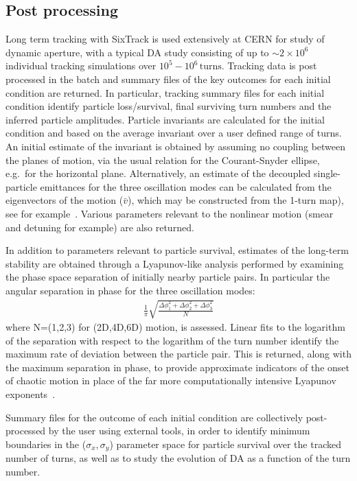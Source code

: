 \documentclass[a4paper,
              ]{jacow}
\begin{document}
\subsection{Post processing}
Long term tracking with SixTrack is used extensively at CERN for study of dynamic aperture, with a typical DA study consisting of up to $\sim 2\times 10^{6}$ individual tracking simulations over $10^5-10^6\,\mathrm{turns}$.
Tracking data is post processed in the batch and summary files of the key outcomes for each initial condition are returned.
In particular, tracking summary files for each initial condition identify particle loss/survival, final surviving turn numbers and the inferred particle amplitudes.
Particle invariants are calculated for the initial condition and based on the average invariant over a user defined range of turns.
An initial estimate of the invariant is obtained by assuming no coupling between the planes of motion, via the usual relation for the Courant-Snyder ellipse, e.g.\ for the horizontal plane.
Alternatively, an estimate of the decoupled single-particle emittances for the three oscillation modes can be calculated from the eigenvectors of the motion ($\bar{v}$), which may be constructed from the 1-turn map), see for example~\cite{maisripken}.
Various parameters relevant to the nonlinear motion (smear and detuning for example) are also returned.

In addition to parameters relevant to particle survival, estimates of the long-term stability are obtained through a Lyapunov-like analysis performed by examining the phase space separation of initially nearby particle pairs.
In particular the angular separation in phase for the three oscillation modes:
\begin{align}
&\frac{1}{\pi}\sqrt{\frac{ \Delta\phi_{1}^2 + \Delta\phi_{2}^2 + \Delta\phi_{3}^2 }{N}}&\nonumber
\end{align}
where N=(1,2,3) for (2D,4D,6D) motion, is assessed.
Linear fits to the logarithm of the separation with respect to the logarithm of the turn number identify the maximum rate of deviation between the particle pair.
This is returned, along with the maximum separation in phase, to provide approximate indicators of the onset of chaotic motion in place of the far more computationally intensive Lyapunov exponents~\cite{chaosproxy,distanceslope}.

Summary files for the outcome of each initial condition are collectively post-processed by the user using external tools, in order to identify minimum boundaries in the ($\sigma_{x},\sigma_{y}$) parameter space for particle survival over the tracked number of turns, as well as to study the evolution of DA as a function of the turn number.
\end{document}
